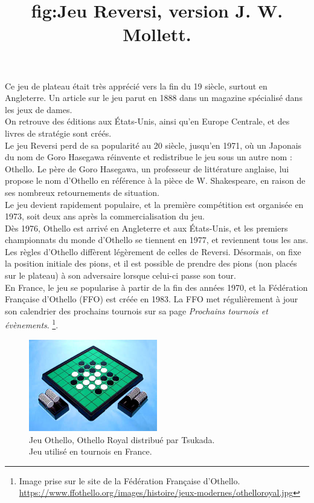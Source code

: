 \documentclass[a4paper,12pt]{article}
\begin{document}
Ce jeu de plateau était très apprécié vers la fin du 19 siècle, surtout
en Angleterre. Un article sur le jeu parut en 1888 dans un magazine spécialisé
dans les jeux de dames.\\ \newpage On retrouve des éditions aux États-Unis,
ainsi qu’en Europe Centrale, et des livres de stratégie sont créés.\\ Le jeu
Reversi perd de sa popularité au 20 siècle, jusqu’en 1971, où un
Japonais du nom de Goro Hasegawa réinvente et redistribue le jeu sous un autre
nom : Othello. Le père de Goro Hasegawa, un professeur de littérature anglaise,
lui propose le nom d’Othello en référence à la pièce de W. Shakespeare, en
raison de ses nombreux retournements de situation.\\ Le jeu devient rapidement
populaire, et la première compétition est organisée en 1973, soit deux ans
après la commercialisation du jeu.\\ Dès 1976, Othello est arrivé en Angleterre
et aux États-Unis, et les premiers championnats du monde d’Othello se tiennent
en 1977, et reviennent tous les ans.\\ Les règles d’Othello diffèrent
légèrement de celles de Reversi. Désormais, on fixe la position initiale des
pions, et il est possible de prendre des pions (non placés sur le plateau) à
son adversaire lorsque celui-ci passe son tour.\\ En France, le jeu se
popularise à partir de la fin des années 1970, et la Fédération Française
d’Othello (FFO) est créée en 1983. La FFO met régulièrement à jour son
calendrier des prochains tournois sur sa page \textit{Prochains tournois et
    évènements}.\cite{FFOthelloTournois} \footnote{Image prise sur le site de la
    Fédération Française d’Othello.
    \url{https://www.ffothello.org/images/histoire/jeux-modernes/othelloroyal.jpg}}.\\

\begin{figure}[h]
    \centering
    \includegraphics[width=0.5\textwidth]{images/othelloroyal.jpg}
    \caption{Jeu Othello, Othello Royal distribué par Tsukada.\\
        Jeu utilisé en tournois en France.}
    \title{fig:Jeu Reversi, version J. W. Mollett.}
\end{figure}
\end{document}
